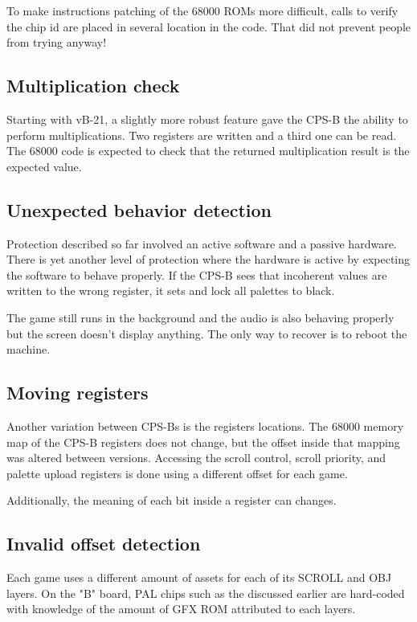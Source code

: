 To make instructions patching of the 68000 ROMs more difficult, calls to verify the chip id are placed in several location in the code. That did not prevent people from trying anyway\cite{strider_conversion}!

\subsection{Multiplication check}
Starting with vB-21, a slightly more robust feature gave the CPS-B the ability to perform multiplications. Two registers are written and a third one can be read. The 68000 code is expected to check that the returned multiplication result is the expected value.

\subsection{Unexpected behavior detection}
Protection described so far involved an active software and a passive hardware. There is yet another level of protection where the hardware is active by expecting the software to behave properly. If the CPS-B sees that incoherent values are written to the wrong register, it sets and lock all palettes to black. 

The game still runs in the background and the audio is also behaving properly but the screen doesn't display anything. The only way to recover is to reboot the machine\cite{petitSecurity}.

\subsection{Moving registers}
Another variation between CPS-Bs is the registers locations. The 68000 memory map of the CPS-B registers does not change, but the offset inside that mapping was altered between versions. Accessing the scroll control, scroll priority, and palette upload registers is done using a different offset for each game.

Additionally, the meaning of each bit inside a register can changes.






\subsection{Invalid offset detection}

Each game uses a different amount of assets for each of its SCROLL and OBJ layers. On the "B" board, PAL chips such as the  discussed earlier are hard-coded with knowledge of the amount of GFX ROM attributed to each layers.


